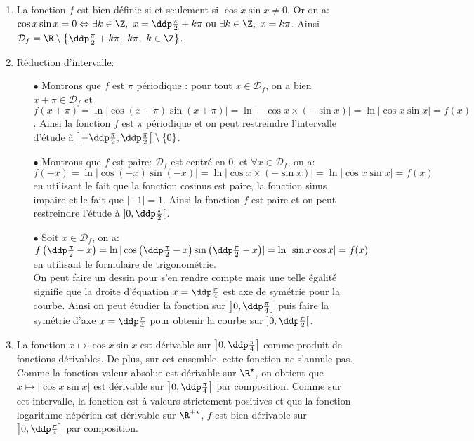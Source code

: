\begin{correction}  \;
\begin{enumerate}
\item La fonction $f$ est bien d\'efinie si et seulement si $\cos{x}\sin{x}\not= 0$. Or on a: $\cos{x}\sin{x}=0\Leftrightarrow \exists k\in\Z,\ x=\ddp\frac{\pi}{2}+k\pi\ \hbox{ou}\ \exists k\in\Z,\ x=k\pi$. Ainsi $\mathcal{D}_f=\R\setminus\left\lbrace \ddp\frac{\pi}{2}+k\pi,\ k\pi,\ k\in\Z\right\rbrace$.
\item R\'eduction d'intervalle:
\begin{itemize}
\item[$\bullet$] Montrons que $f$ est $\pi$ p\'eriodique : pour tout $x\in\mathcal{D}_f$, on a bien $x+\pi\in\mathcal{D}_f$ et $f(x+\pi)=\ln{ |  \cos{(x+\pi)} \sin{(x+\pi)} | }=\ln{| -\cos{x}\times (-\sin{x})| }=\ln{ | \cos{x}\sin{x} | }=f(x)$.
Ainsi la fonction $f$ est $\pi$ p\'eriodique et on peut restreindre l'intervalle d'\'etude \`{a} $\left\rbrack -\ddp\frac{\pi}{2},\ddp\frac{\pi}{2}\right\lbrack\setminus\lbrace 0\rbrace$.
\item[$\bullet$] Montrons que $f$ est paire: $\mathcal{D}_f$ est centr\'e en 0, et $\forall x\in\mathcal{D}_f$, on a: $f(-x)=\ln{ |  \cos{(-x)}\sin{(-x)} | }=\ln{  |  \cos{x}\times (-\sin{x})  | }=\ln{|  \cos{x} \sin{x}|}=f(x)$ en utilisant le fait que la fonction cosinus est paire, la fonction sinus impaire et le fait que $|-1|=1$.
Ainsi la fonction $f$ est paire et on peut restreindre l'\'etude \`{a} $\rbrack 0,\ddp\frac{\pi}{2}\lbrack$. 
\item[$\bullet$] Soit $x\in\mathcal{D}_f$, on a: $f\left(  \ddp\frac{\pi}{2}-x \right)=
 \ln{  |  \cos{ \left(  \ddp\frac{\pi}{2}-x \right)}  \sin{ \left(  \ddp\frac{\pi}{2}-x \right)  }  | } = \ln{ |  \sin{x}\cos{x}   |  }=f(x)  $ en utilisant le formulaire de trigonom\'etrie. \\
\noindent On peut faire un dessin pour s'en rendre compte mais une telle \'egalit\'e signifie que la droite d'\'equation 
$x=\ddp\frac{\pi}{4}$ est axe de sym\'etrie pour la courbe. Ainsi on peut \'etudier la fonction sur $\left\rbrack 0,\ddp\frac{\pi}{4}\right\rbrack$ puis faire la sym\'etrie d'axe $x=\ddp\frac{\pi}{4}$ pour obtenir la courbe sur $\rbrack 0,\ddp\frac{\pi}{2}\lbrack$.  
\end{itemize}
\item La fonction $x\mapsto \cos{x}\sin{x}$ est d\'erivable sur $\left\rbrack 0,\ddp\frac{\pi}{4}\right\rbrack$ comme produit de fonctions d\'erivables. De plus, sur cet ensemble, cette fonction ne s'annule pas. Comme la fonction valeur absolue est d\'erivable sur $\R^{\star}$, on obtient que $x\mapsto | \cos{x}\sin{x}|$ est d\'erivable sur $\left\rbrack 0,\ddp\frac{\pi}{4}\right\rbrack$ par composition. Comme sur cet intervalle, la fonction est \`{a} valeurs strictement positives et que la fonction logarithme n\'ep\'erien est d\'erivable sur $\R^{+\star}$, $f$ est bien d\'erivable sur $\left\rbrack 0,\ddp\frac{\pi}{4}\right\rbrack$ par composition.\\

\end{enumerate}
\end{correction}
